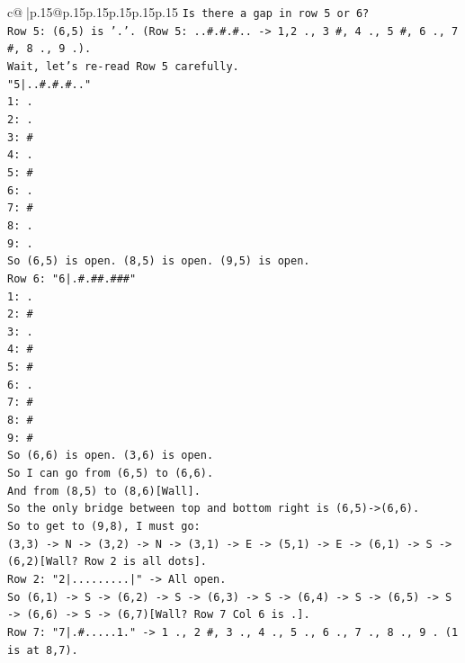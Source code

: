 \documentclass{article}
\begin{document}
{\begin{supertabular}{c@{$\;$}|p{.15\linewidth}@{}p{.15\linewidth}p{.15\linewidth}p{.15\linewidth}p{.15\linewidth}p{.15\linewidth}}
{{{\texttt{Is there a gap in row 5 or 6?} \\
\texttt{Row 5: (6,5) is '.'. (Row 5: ..\#.\#.\#.. {-}> 1,2 ., 3 \#, 4 ., 5 \#, 6 ., 7 \#, 8 ., 9 .).} \\
\texttt{Wait, let's re{-}read Row 5 carefully.} \\
\texttt{"5|..\#.\#.\#.."} \\
\texttt{1: .} \\
\texttt{2: .} \\
\texttt{3: \#} \\
\texttt{4: .} \\
\texttt{5: \#} \\
\texttt{6: .} \\
\texttt{7: \#} \\
\texttt{8: .} \\
\texttt{9: .} \\
\texttt{So (6,5) is open. (8,5) is open. (9,5) is open.} \\
\texttt{Row 6: "6|.\#.\#\#.\#\#\#"} \\
\texttt{1: .} \\
\texttt{2: \#} \\
\texttt{3: .} \\
\texttt{4: \#} \\
\texttt{5: \#} \\
\texttt{6: .} \\
\texttt{7: \#} \\
\texttt{8: \#} \\
\texttt{9: \#} \\
\texttt{So (6,6) is open. (3,6) is open.} \\
\texttt{So I can go from (6,5) to (6,6).} \\
\texttt{And from (8,5) to (8,6){[}Wall{]}.} \\
\texttt{So the only bridge between top and bottom right is (6,5){-}>(6,6).} \\
\texttt{So to get to (9,8), I must go:} \\
\texttt{(3,3) {-}> N {-}> (3,2) {-}> N {-}> (3,1) {-}> E {-}> (5,1) {-}> E {-}> (6,1) {-}> S {-}> (6,2){[}Wall? Row 2 is all dots{]}.} \\
\texttt{Row 2: "2|.........|" {-}> All open.} \\
\texttt{So (6,1) {-}> S {-}> (6,2) {-}> S {-}> (6,3) {-}> S {-}> (6,4) {-}> S {-}> (6,5) {-}> S {-}> (6,6) {-}> S {-}> (6,7){[}Wall? Row 7 Col 6 is .{]}.} \\
\texttt{Row 7: "7|.\#.....1." {-}> 1 ., 2 \#, 3 ., 4 ., 5 ., 6 ., 7 ., 8 ., 9 . (1 is at 8,7).} \\
}}}
\end{supertabular}}
\end{document}
